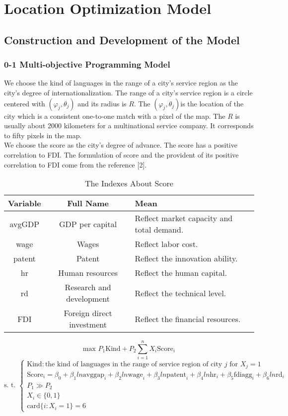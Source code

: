 \documentclass{mcmthesis}
\begin{document}
\section{Location Optimization Model}
\subsection{Construction and Development of the Model}
\subsubsection{0-1 Multi-objective Programming Model}
We choose the kind of languages in the range of a city's service region as the city's degree of internationalization. The range of a city's service region is a circle centered with \((\varphi_j, \theta_j)\) and its radius is \(R\). The \((\varphi_j, \theta_j)\)is the location of the city which is a consistent one-to-one match with a pixel of the map. The \(R\) is usually about 2000 kilometers for a multinational service company. It corresponds to fifty pixels in the map.\\
\indent We choose the score as the city's degree of advance. The score has a positive correlation to FDI. The formulation of score and the provident of its positive correlation to FDI come from the reference [2].
\begin{table}[htbp]
\centering
\caption{The Indexes About Score}
\begin{tabular}{|c|c|l||}
\hline
Variable&Full Name&Mean\\
\hline
avgGDP&GDP per capital&Reflect market capacity and total demand.\\
\hline
wage&Wages&Reflect labor cost.\\
\hline
patent&Patent&Reflect the innovation ability.\\
\hline
hr&Human resources&Reflect the human capital.\\
\hline
rd&Research and development&Reflect the technical level.\\
\hline
FDI&Foreign direct investment&Reflect the financial resources.\\
\hline
\end{tabular}
\end{table}
\[\textrm{max }P_1\textrm{Kind}+P_2\sum\limits_{i=1}^{n}X_i\textrm{Score}_i\]
\[\textrm{s. t. }\left\{
\begin{array}{l}
\textrm{Kind}: \textrm{the kind of languages in the range of service region of city }j\textrm{ for }X_j=1\\
\textrm{Score}_i=\beta_0+\beta_1ln\textrm{avggap}_i+\beta_2ln\textrm{wage}_i+\beta_3ln\textrm{patent}_i+\beta_4ln\textrm{hr}_i+\beta_5\textrm{fdiagg}_i+\beta_6ln\textrm{rd}_i\\
P_1\gg P_2\\
X_i\in\{0, 1\}\\
\textrm{card}\{i: X_i=1\}=6
\end{array}\right. \]
\end{document}
